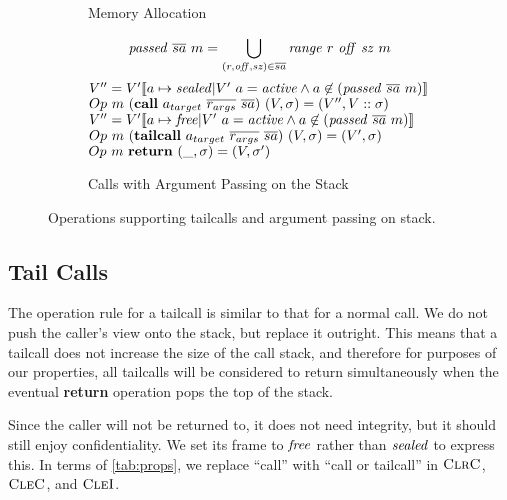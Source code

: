 \documentclass[10pt,conference]{ieeetran}%
\theoremstyle{definition}
\begin{document}
\begin{figure*}
\begin{subfigure}{0.4\textwidth}
    \caption{Memory Allocation}
    \label{sfig:publicalloc}
  \end{subfigure}
  \begin{subfigure}{0.6\textwidth}
    \[\mathit{passed} ~ \overline{sa} ~ m = \bigcup_{(r,\mathit{off},\mathit{sz}) \in \overline{sa}}
    \mathit{range} ~ r ~ \mathit{off} ~ \mathit{sz} ~ m\]
               {\(V'' = V'\llbracket a \mapsto \mathit{sealed} | V' ~ a = \mathit{active} \land a \not \in (\mathit{passed} ~ \overline{sa} ~ m) \rrbracket\)}
               {\(Op ~ m ~ (\mathbf{call} ~ a_{target} ~ \overline{r_{args}} ~ \overline{sa})
                 ~ (V,\sigma) = (V'',V::\sigma)\)}
               {\(V'' = V'\llbracket a \mapsto \mathit{free} | V' ~ a = \mathit{active} \land a \not \in (\mathit{passed} ~ \overline{sa} ~ m) \rrbracket\)}
               {\(Op ~ m ~ (\mathbf{tailcall} ~ a_{target} ~ \overline{r_{args}} ~ \overline{sa})
                 ~ (V,\sigma) = (V',\sigma)\)}
             {\(Op ~ m ~ \mathbf{return} ~ (\_, \sigma) = (V, \sigma')\)}

    \caption{Calls with Argument Passing on the Stack}
    \label{sfig:stkargs}
  \end{subfigure}
  \caption{Operations supporting tailcalls and argument passing on stack.}
  \label{fig:advops}
\end{figure*}

\subsection{Tail Calls}

The operation rule for a tailcall is similar to that for a normal call.
We do not push the caller's view onto the stack,
but replace it outright. This means that a tailcall does not increase the size of
the call stack, and therefore for purposes of our properties, all tailcalls will
be considered to return simultaneously when the eventual {\bf return} operation
pops the top of the stack.

Since the caller will not be returned to, it does not need integrity, but
it should still enjoy confidentiality. We set its frame to \(\mathit{free}\) rather
than \(\mathit{sealed}\) to express this. In terms of \cref{tab:props}, we replace
``call'' with ``call or tailcall'' in \(\textnormal{\sc ClrC}\), \(\textnormal{\sc CleC}\), and \(\textnormal{\sc CleI}\).
\end{document}
